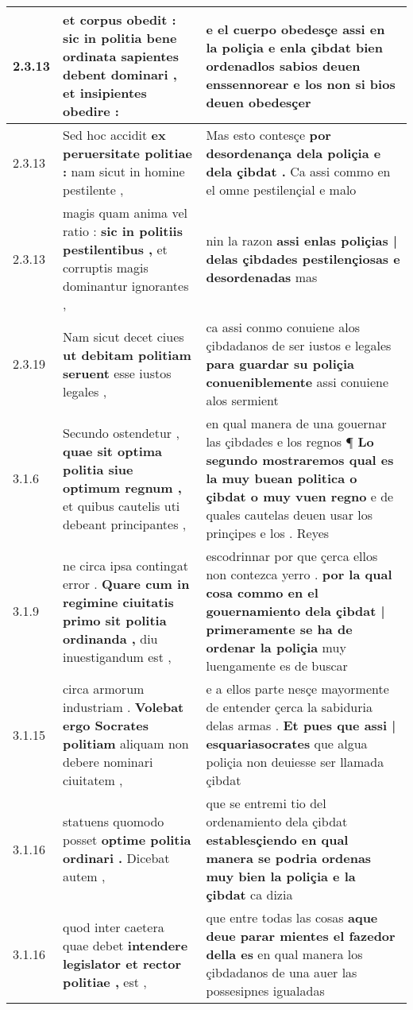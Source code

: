 \begin{tabular}{|p{1cm}|p{6.5cm}|p{6.5cm}|}
2.3.13 & et corpus obedit : \textbf{ sic in politia bene ordinata sapientes debent dominari , } et insipientes obedire : & e el cuerpo obedesçe assi en la poliçia \textbf{ e enla çibdat bien ordenadlos sabios deuen enssennorear } e los non si bios deuen obedesçer \\\hline
2.3.13 & Sed hoc accidit \textbf{ ex peruersitate politiae : } nam sicut in homine pestilente , & Mas esto contesçe \textbf{ por desordenança dela poliçia e dela çibdat . } Ca assi commo en el omne pestilençial e malo \\\hline
2.3.13 & magis quam anima vel ratio : \textbf{ sic in politiis pestilentibus , } et corruptis magis dominantur ignorantes , & nin la razon \textbf{ assi enlas poliçias | delas çibdades pestilençiosas e desordenadas } mas \\\hline
2.3.19 & Nam sicut decet ciues \textbf{ ut debitam politiam seruent } esse iustos legales , & ca assi conmo conuiene alos çibdadanos de ser iustos e legales \textbf{ para guardar su poliçia conueniblemente } assi conuiene alos sermient \\\hline
3.1.6 & Secundo ostendetur , \textbf{ quae sit optima politia siue optimum regnum , } et quibus cautelis uti debeant principantes , & en qual manera de una gouernar las çibdades e los regnos ¶ \textbf{ Lo segundo mostraremos qual es la muy buean politica o çibdat o muy vuen regno } e de quales cautelas deuen usar los prinçipes e los . Reyes \\\hline
3.1.9 & ne circa ipsa contingat error . \textbf{ Quare cum in regimine ciuitatis primo sit politia ordinanda , } diu inuestigandum est , & escodrinnar por que çerca ellos non contezca yerro . \textbf{ por la qual cosa commo en el gouernamiento dela çibdat | primeramente se ha de ordenar la poliçia } muy luengamente es de buscar \\\hline
3.1.15 & circa armorum industriam . \textbf{ Volebat ergo Socrates politiam } aliquam non debere nominari ciuitatem , & e a ellos parte nesçe mayormente de entender çerca la sabiduria delas armas . \textbf{ Et pues que assi | esquariasocrates } que algua poliçia non deuiesse ser llamada çibdat \\\hline
3.1.16 & statuens quomodo posset \textbf{ optime politia ordinari . } Dicebat autem , & que se entremi tio del ordenamiento dela çibdat \textbf{ establesçiendo en qual manera se podria ordenas muy bien la poliçia e la çibdat } ca dizia \\\hline
3.1.16 & quod inter caetera quae debet \textbf{ intendere legislator et rector politiae , } est , & que entre todas las cosas \textbf{ aque deue parar mientes el fazedor della es } en qual manera los çibdadanos de una auer las possesipnes igualadas \\\hline

\end{tabular}
